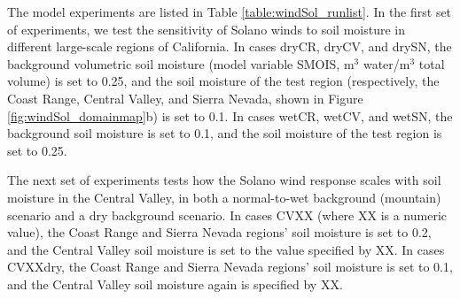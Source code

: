 The model experiments are listed in Table \ref{table:windSol_runlist}.  In the first set of experiments, we test the sensitivity of Solano winds to soil moisture in different large-scale regions of California.  In cases dryCR, dryCV, and drySN, the background volumetric soil moisture (model variable SMOIS, m$^3$ water/m$^3$ total volume) is set to 0.25, and the soil moisture of the test region (respectively, the Coast Range, Central Valley, and Sierra Nevada, shown in Figure \ref{fig:windSol_domainmap}b) is set to 0.1.  In cases wetCR, wetCV, and wetSN, the background soil moisture is set to 0.1, and the soil moisture of the test region is set to 0.25.

The next set of experiments tests how the Solano wind response scales with soil moisture in the Central Valley, in both a normal-to-wet background (mountain) scenario and a dry background scenario.  In cases CVXX (where XX is a numeric value), the Coast Range and Sierra Nevada regions' soil moisture is set to 0.2, and the Central Valley soil moisture is set to the value specified by XX.  In cases CVXXdry, the Coast Range and Sierra Nevada regions' soil moisture is set to 0.1, and the Central Valley soil moisture again is specified by XX.

